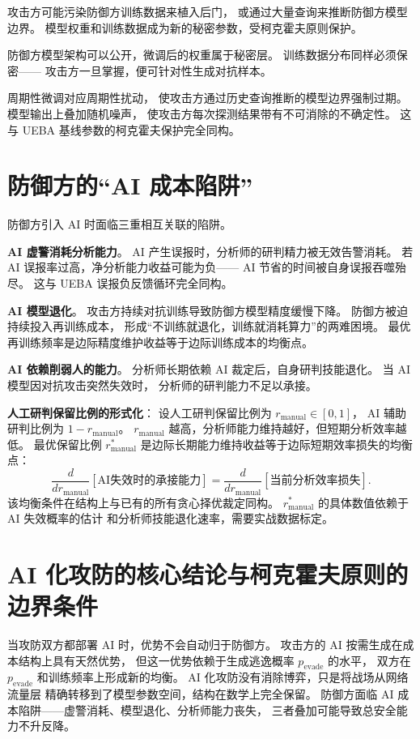 \documentclass[11pt,a4paper]{article}
\begin{document}
攻击方可能污染防御方训练数据来植入后门，
或通过大量查询来推断防御方模型边界。
模型权重和训练数据成为新的秘密参数，受柯克霍夫原则保护。

防御方模型架构可以公开，微调后的权重属于秘密层。
训练数据分布同样必须保密——
攻击方一旦掌握，便可针对性生成对抗样本。

周期性微调对应周期性扰动，
使攻击方通过历史查询推断的模型边界强制过期。
模型输出上叠加随机噪声，
使攻击方每次探测结果带有不可消除的不确定性。
这与 UEBA 基线参数的柯克霍夫保护完全同构。

\section{防御方的“AI 成本陷阱”}

防御方引入 AI 时面临三重相互关联的陷阱。

\textbf{AI 虚警消耗分析能力}。
AI 产生误报时，分析师的研判精力被无效告警消耗。
若 AI 误报率过高，净分析能力收益可能为负——
AI 节省的时间被自身误报吞噬殆尽。
这与 UEBA 误报负反馈循环完全同构。

\textbf{AI 模型退化}。
攻击方持续对抗训练导致防御方模型精度缓慢下降。
防御方被迫持续投入再训练成本，
形成“不训练就退化，训练就消耗算力”的两难困境。
最优再训练频率是边际精度维护收益等于边际训练成本的均衡点。

\textbf{AI 依赖削弱人的能力}。
分析师长期依赖 AI 裁定后，自身研判技能退化。
当 AI 模型因对抗攻击突然失效时，
分析师的研判能力不足以承接。

\textbf{人工研判保留比例的形式化}：
设人工研判保留比例为 \(r_{\text{manual}} \in [0,1]\)，
AI 辅助研判比例为 \(1 - r_{\text{manual}}\)。
\(r_{\text{manual}}\) 越高，分析师能力维持越好，但短期分析效率越低。
最优保留比例 \(r_{\text{manual}}^*\)
是边际长期能力维持收益等于边际短期效率损失的均衡点：
\[
\frac{d}{dr_{\text{manual}}} \left[ \text{AI失效时的承接能力} \right]
= \frac{d}{dr_{\text{manual}}} \left[ \text{当前分析效率损失} \right].
\]
该均衡条件在结构上与已有的所有贪心择优裁定同构。
\(r_{\text{manual}}^*\) 的具体数值依赖于 AI 失效概率的估计
和分析师技能退化速率，需要实战数据标定。

\section{AI 化攻防的核心结论与柯克霍夫原则的边界条件}

当攻防双方都部署 AI 时，优势不会自动归于防御方。
攻击方的 AI 按需生成在成本结构上具有天然优势，
但这一优势依赖于生成逃逸概率 \(p_{\text{evade}}\) 的水平，
双方在 \(p_{\text{evade}}\) 和训练频率上形成新的均衡。
AI 化攻防没有消除博弈，只是将战场从网络流量层
精确转移到了模型参数空间，结构在数学上完全保留。
防御方面临 AI 成本陷阱——虚警消耗、模型退化、分析师能力丧失，
三者叠加可能导致总安全能力不升反降。
\end{document}
